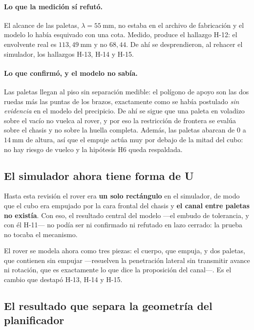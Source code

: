 \documentclass[11pt,a4paper]{article}
\begin{document}
\paragraph{Lo que la medición sí refutó.} El alcance de las paletas,
$\lambda = 55\ \mathrm{mm}$, no estaba en el archivo de fabricación y el modelo lo había
esquivado con una cota. Medido, produce el hallazgo H-12: el envolvente real es
$113{,}49\ \mathrm{mm}$ y no $68{,}44$. De ahí se desprendieron, al rehacer el simulador,
los hallazgos H-13, H-14 y H-15.

\paragraph{Lo que confirmó, y el modelo no sabía.} Las paletas llegan al piso sin
separación medible: el polígono de apoyo son las dos ruedas más las puntas de los brazos,
exactamente como se había postulado \emph{sin evidencia} en el modelo del precipicio. De
ahí se sigue que una paleta en voladizo sobre el vacío no vuelca al rover, y por eso la
restricción de frontera se evalúa sobre el chasis y no sobre la huella completa. Además,
las paletas abarcan de $0$ a $14\ \mathrm{mm}$ de altura, así que el empuje actúa muy por
debajo de la mitad del cubo: no hay riesgo de vuelco y la hipótesis H6 queda respaldada.

\subsection{El simulador ahora tiene forma de U}

Hasta esta revisión el rover era \textbf{un solo rectángulo} en el simulador, de modo que
el cubo era empujado por la cara frontal del chasis y \textbf{el canal entre paletas no
existía}. Con eso, el resultado central del modelo ---el embudo de tolerancia, y con él
H-11--- no podía ser ni confirmado ni refutado en lazo cerrado: la prueba no tocaba el
mecanismo.

El rover se modela ahora como tres piezas: el cuerpo, que empuja, y dos paletas, que
contienen sin empujar ---resuelven la penetración lateral sin transmitir avance ni
rotación, que es exactamente lo que dice la proposición del canal---. Es el cambio que
destapó H-13, H-14 y H-15.

\subsection{El resultado que separa la geometría del planificador}
\end{document}
